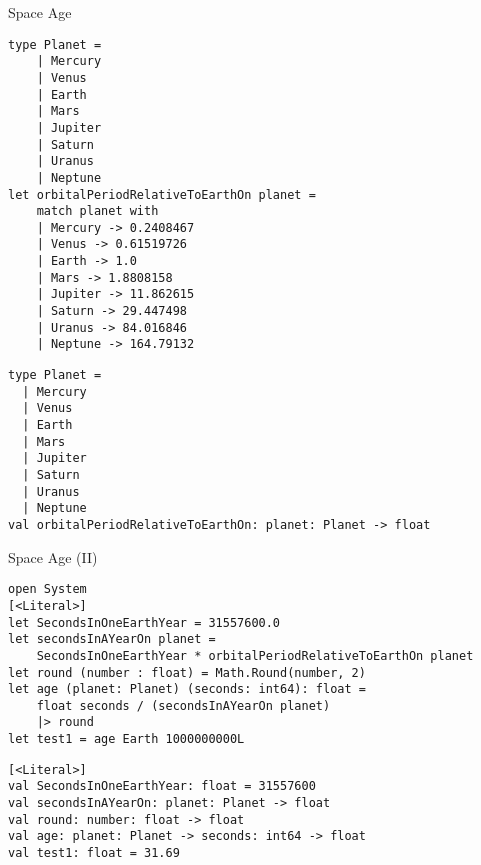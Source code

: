 \documentclass[t]{beamer}
\begin{document}
\begin{frame}[label={sec:orgd3a40f9},fragile]{Space Age}
 \begin{verbatim}
type Planet = 
    | Mercury
    | Venus
    | Earth
    | Mars
    | Jupiter
    | Saturn
    | Uranus
    | Neptune
let orbitalPeriodRelativeToEarthOn planet = 
    match planet with
    | Mercury -> 0.2408467
    | Venus -> 0.61519726
    | Earth -> 1.0
    | Mars -> 1.8808158
    | Jupiter -> 11.862615
    | Saturn -> 29.447498
    | Uranus -> 84.016846
    | Neptune -> 164.79132
\end{verbatim}

\begin{verbatim}
type Planet =
  | Mercury
  | Venus
  | Earth
  | Mars
  | Jupiter
  | Saturn
  | Uranus
  | Neptune
val orbitalPeriodRelativeToEarthOn: planet: Planet -> float
\end{verbatim}
\end{frame}

\begin{frame}[label={sec:org155f1d4},fragile]{Space Age (II)}
 \begin{verbatim}
open System
[<Literal>]
let SecondsInOneEarthYear = 31557600.0
let secondsInAYearOn planet =
    SecondsInOneEarthYear * orbitalPeriodRelativeToEarthOn planet
let round (number : float) = Math.Round(number, 2)
let age (planet: Planet) (seconds: int64): float =
    float seconds / (secondsInAYearOn planet)
    |> round
let test1 = age Earth 1000000000L
\end{verbatim}

\begin{verbatim}
[<Literal>]
val SecondsInOneEarthYear: float = 31557600
val secondsInAYearOn: planet: Planet -> float
val round: number: float -> float
val age: planet: Planet -> seconds: int64 -> float
val test1: float = 31.69
\end{verbatim}
\end{frame}
\end{document}
